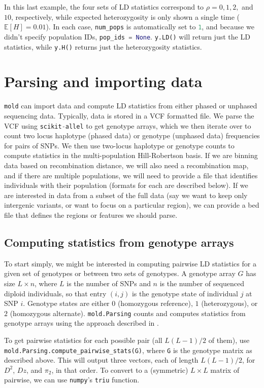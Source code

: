 \documentclass[11pt]{article}
\makeatletter
\newcommand{\mold}{\texttt{mold}\xspace}
\newcommand{\py}[1]{\lstinline[breaklines=true,language=Python, showstringspaces=False]@#1@}
\newcommand{\E}{\mathbb{E}}
\makeatother
\begin{document}
In this last example, the four sets of LD statistics correspond to $\rho=0,1,2,$ and $10$, respectively, while expected heterozygosity is only shown a single time ($\E[H]=0.01$).
In each case, \py{num_pops} is automatically set to \py{1}, and because we didn't specify population IDs, \py{pop_ids = None}.
\py{y.LD()} will return just the LD statistics, while \py{y.H()} returns just the heterozygosity statistics.



\section{Parsing and importing data}

\mold can import data and compute LD statistics from either phased or unphased sequencing data.
Typically, data is stored in a VCF formatted file.
We parse the VCF using \py{scikit-allel} to get genotype arrays, which we then iterate over to count two locus haplotype (phased data) or genotype (unphased data) frequencies for pairs of SNPs.
We then use two-locus haplotype or genotype counts to compute statistics in the multi-population Hill-Robertson basis.
If we are binning data based on recombination distance, we will also need a recombination map, and if there are multiple populations, we will need to provide a file that identifies individuals with their population (formats for each are described below).
If we are interested in data from a subset of the full data (say we want to keep only intergenic variants, or want to focus on a particular region), we can provide a bed file that defines the regions or features we should parse.

\subsection{Computing statistics from genotype arrays}
To start simply, we might be interested in computing pairwise LD statistics for a given set of genotypes or between two sets of genotypes.
A genotype array $G$ has size $L\times n$, where $L$ is the number of SNPs and $n$ is the number of sequenced diploid individuals, so that entry $(i,j)$ is the genotype state of individual $j$ at SNP $i$.
Genotype states are either $0$ (homozygous reference), $1$ (heterozygous), or $2$ (homozygous alternate).
\py{mold.Parsing} counts and computes statistics from genotype arrays using the approach described in \citet{Ragsdale2019}.

To get pairwise statistics for each possible pair (all $L(L-1)/2$ of them), use \py{mold.Parsing.compute_pairwise_stats(G)}, where \py{G} is the genotype matrix as described above.
This will output three vectors, each of length $L(L-1)/2$, for $D^2$, $Dz$, and $\pi_2$, in that order.
To convert to a (symmetric) $L\times L$ matrix of pairwise, we can use \py{numpy}'s \py{triu} function.
\end{document}
